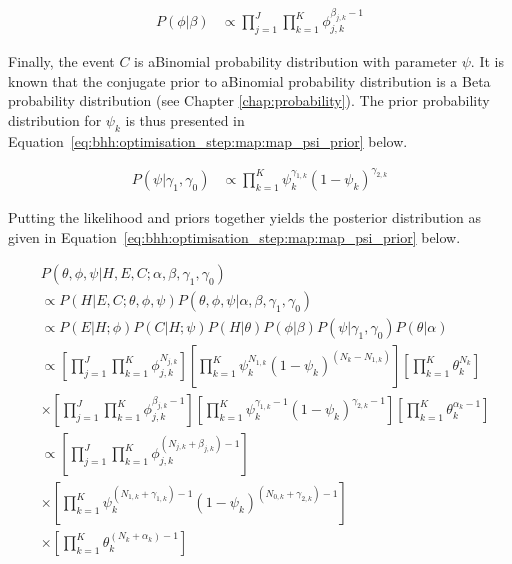 \begin{equation}
      \label{eq:bhh:optimisation_step:map:map_phi_prior}
      \begin{split}
            P(\phi \vert \beta)
            &\propto \prod_{j=1}^{J}  \prod_{k=1}^{K} \phi_{j,k}^{\beta_{j,k} -1}
      \end{split}
\end{equation}

Finally, the event $C$ is aBinomial probability distribution with parameter $\psi$. It is known that the conjugate prior to aBinomial probability distribution is a Beta probability distribution (see Chapter \ref{chap:probability}). The prior probability distribution for $\psi_{k}$ is thus presented in Equation~\eqref{eq:bhh:optimisation_step:map:map_psi_prior} below.

\begin{equation}
      \label{eq:bhh:optimisation_step:map:map_psi_prior}
      \begin{split}
            P(\psi | \gamma_{1}, \gamma_{0})
            &\propto \prod_{k=1}^{K} \psi_{k}^{\gamma_{1,k}} (1- \psi_{k})^{\gamma_{2,k}}
      \end{split}
\end{equation}

Putting the likelihood and priors together yields the posterior distribution as given in Equation~\eqref{eq:bhh:optimisation_step:map:map_psi_prior} below.

\begin{equation}
      \label{eq:bhh:optimisation_step:map:posterior}
      \begin{split}
            & P(\theta, \phi, \psi \vert H, E, C;  \alpha, \beta, \gamma_{1}, \gamma_{0}) \\
            &\propto P(H \vert E, C; \theta, \phi, \psi)P(\theta, \phi, \psi \vert \alpha, \beta, \gamma_{1}, \gamma_{0}) \\
            &\propto P(E \vert H; \phi) P(C \vert H; \psi) P(H \vert \theta) P(\phi \vert \beta) P(\psi \vert \gamma_{1}, \gamma_{0}) P(\theta \vert \alpha)  \\
            &\propto \left[ \prod_{j=1}^{J} \prod_{k=1}^{K} \phi_{j,k}^{N_{j,k}} \right] \left[ \prod_{k=1}^{K} \psi_{k}^{N_{1,k}} (1 - \psi_{k})^{(N_{k} - N_{1,k})} \right] \left[ \prod_{k=1}^{K} \theta_{k}^{N_{k}} \right] \\
            &\times \left[ \prod_{j=1}^{J} \prod_{k=1}^{K} \phi_{j,k}^{\beta_{j,k} - 1} \right] \left[ \prod_{k=1}^{K} \psi_{k}^{\gamma_{1,k} - 1} (1 - \psi_{k})^{\gamma_{2,k} - 1} \right] \left[ \prod_{k=1}^{K} \theta_{k}^{\alpha_{k} - 1} \right] \\
            &\propto \left[ \prod_{j=1}^{J} \prod_{k=1}^{K} \phi_{j,k}^{(N_{j,k} + \beta_{j,k}) - 1} \right] \\
            &\times \left[ \prod_{k=1}^{K} \psi_{k}^{(N_{1,k} + \gamma_{1,k}) - 1} (1 - \psi_{k})^{(N_{0,k} + \gamma_{2,k} )- 1} \right] \\
            &\times \left[ \prod_{k=1}^{K} \theta_{k}^{(N_{k} + \alpha_{k}) - 1} \right]
      \end{split}
\end{equation}

